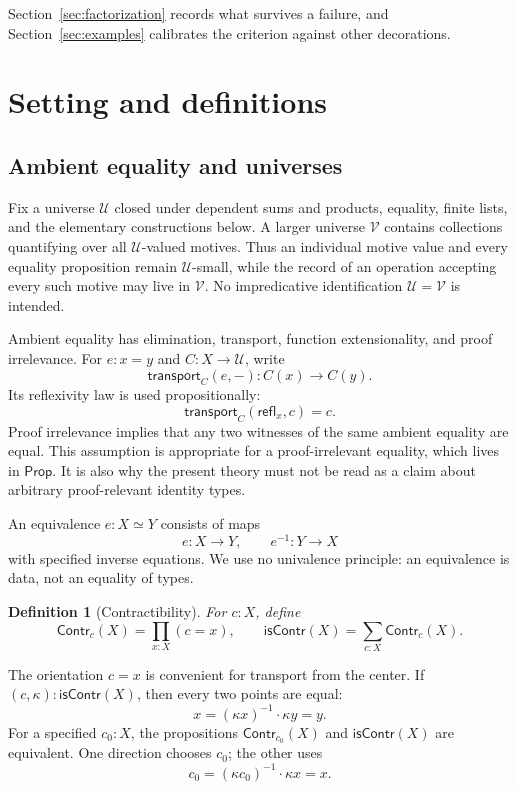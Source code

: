 \documentclass[10pt,reqno]{amsart}
\newtheorem{definition}[theorem]{Definition}
\newcommand{\U}{\mathcal U}
\newcommand{\V}{\mathcal V}
\newcommand{\isContr}{\mathsf{isContr}}
\newcommand{\Contr}{\mathsf{Contr}}
\newcommand{\Eqv}{\simeq}
\newcommand{\refl}{\mathsf{refl}}
\newcommand{\transport}{\mathsf{transport}}
\begin{document}
Section~\ref{sec:factorization} records what survives a failure, and
Section~\ref{sec:examples} calibrates the criterion against other decorations.

\section{Setting and definitions}
\label{sec:setting}

\subsection{Ambient equality and universes}

Fix a universe \(\U\) closed under dependent sums and products, equality,
finite lists, and the elementary constructions below.  A larger universe
\(\V\) contains collections quantifying over all \(\U\)-valued motives.
Thus an individual motive value and every equality proposition remain
\(\U\)-small, while the record of an operation accepting every such motive
may live in \(\V\).  No impredicative identification \(\U=\V\) is intended.

Ambient equality has elimination, transport, function extensionality, and
proof irrelevance.  For \(e:x=y\) and \(C:X\to\U\), write
\[
                  \transport_C(e,-):C(x)\longrightarrow C(y).
\]
Its reflexivity law is used propositionally:
\[
                  \transport_C(\refl_x,c)=c.
\tag{2.1}\label{eq:transport-beta}
\]
Proof irrelevance implies that any two witnesses of the same ambient equality
are equal.  This assumption is appropriate for a proof-irrelevant equality, which
lives in \(\mathsf{Prop}\).  It is also why the present theory must not be read
as a claim about arbitrary proof-relevant identity types.

An equivalence \(e:X\Eqv Y\) consists of maps
\[
 e:X\to Y,\qquad e^{-1}:Y\to X
\]
with specified inverse equations.  We use no univalence principle: an
equivalence is data, not an equality of types.

\begin{definition}[Contractibility]
For \(c:X\), define
\[
 \Contr_c(X)=\prod_{x:X}(c=x),\qquad
 \isContr(X)=\sum_{c:X}\Contr_c(X).
\tag{2.2}\label{eq:contractibility}
\]
\end{definition}

The orientation \(c=x\) is convenient for transport from the center.  If
\((c,\kappa):\isContr(X)\), then every two points are equal:
\[
             x=(\kappa x)^{-1}\cdot\kappa y=y.
\tag{2.3}\label{eq:all-equal}
\]
For a specified \(c_0:X\), the propositions
\(\Contr_{c_0}(X)\) and \(\isContr(X)\) are equivalent.  One direction chooses
\(c_0\); the other uses
\[
      c_0=(\kappa c_0)^{-1}\cdot\kappa x=x.
\tag{2.4}\label{eq:recenter}
\]
\end{document}
